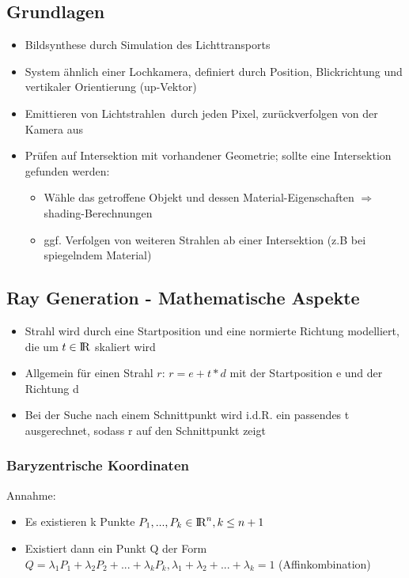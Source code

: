 \documentclass[10pt,a4paper]{article}
\def\realnumbers{{\rm I\!R}}
\begin{document}
	\subsection{Grundlagen}
	\begin{itemize}
		\item Bildsynthese durch Simulation des Lichttransports
		\item System ähnlich einer Lochkamera, definiert durch Position, Blickrichtung und vertikaler Orientierung (up-Vektor)
		\item Emittieren von \glqq Lichtstrahlen\grqq\ durch jeden Pixel, zurückverfolgen von der Kamera aus
		\item Prüfen auf Intersektion mit vorhandener Geometrie; sollte eine Intersektion gefunden werden:
			\begin{itemize}
				\item Wähle das getroffene Objekt und dessen Material-Eigenschaften $\Rightarrow$ \Gls{shading}-Berechnungen
				\item ggf. Verfolgen von weiteren Strahlen ab einer Intersektion (z.B bei spiegelndem Material)
			\end{itemize}
	\end{itemize}

	\subsection{Ray Generation - Mathematische Aspekte}
		\begin{itemize}
			\item Strahl wird durch eine Startposition und eine normierte Richtung modelliert, die um $t \in \realnumbers$ skaliert wird
			\item Allgemein für einen Strahl $r$: $r = e + t * d$ mit der Startposition e und der Richtung d
			\item Bei der Suche nach einem Schnittpunkt wird i.d.R. ein passendes t ausgerechnet, sodass r auf den Schnittpunkt zeigt
		\end{itemize}

	\subsubsection{Baryzentrische Koordinaten}
		Annahme:
		\begin{itemize}
			\item Es existieren k Punkte $P_1, ..., P_k \in \realnumbers^n, k \leq n + 1$
			\item Existiert dann ein Punkt Q der Form $Q = \lambda_1P_1 + \lambda_2P_2 + ... + \lambda_kP_k, \lambda_1 + \lambda_2 + ... + \lambda_k = 1$ (\glqq Affinkombination\grqq)
		\end{itemize}
\end{document}
